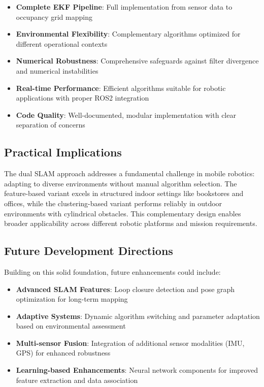 \documentclass[12pt,a4paper]{article}
\begin{document}
\begin{itemize}
    \item \textbf{Complete EKF Pipeline}: Full implementation from sensor data to occupancy grid mapping
    \item \textbf{Environmental Flexibility}: Complementary algorithms optimized for different operational contexts
    \item \textbf{Numerical Robustness}: Comprehensive safeguards against filter divergence and numerical instabilities
    \item \textbf{Real-time Performance}: Efficient algorithms suitable for robotic applications with proper ROS2 integration
    \item \textbf{Code Quality}: Well-documented, modular implementation with clear separation of concerns
\end{itemize}

\subsection*{Practical Implications}

The dual SLAM approach addresses a fundamental challenge in mobile robotics: adapting to diverse environments without manual algorithm selection. The feature-based variant excels in structured indoor settings like bookstores and offices, while the clustering-based variant performs reliably in outdoor environments with cylindrical obstacles. This complementary design enables broader applicability across different robotic platforms and mission requirements.

\subsection*{Future Development Directions}

Building on this solid foundation, future enhancements could include:

\begin{itemize}
    \item \textbf{Advanced SLAM Features}: Loop closure detection and pose graph optimization for long-term mapping
    \item \textbf{Adaptive Systems}: Dynamic algorithm switching and parameter adaptation based on environmental assessment
    \item \textbf{Multi-sensor Fusion}: Integration of additional sensor modalities (IMU, GPS) for enhanced robustness
    \item \textbf{Learning-based Enhancements}: Neural network components for improved feature extraction and data association
\end{itemize}
\end{document}

